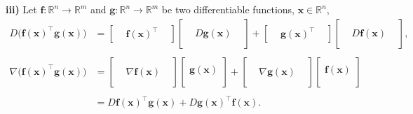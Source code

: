 \noindent
\textbf{iii)} Let \( \boldsymbol{f}: \mathbb{R}^{n} \rightarrow \mathbb{R}^{m}\) and \( \boldsymbol{g}: \mathbb{R}^{n} \rightarrow \mathbb{R}^{m}\) be two differentiable functions, \(\boldsymbol{x} \in \mathbb{R}^{n}\),
\[ 
\begin{aligned}
	D \bigg (\boldsymbol{f}(\boldsymbol{x})^{\top} \boldsymbol{g}(\boldsymbol{x}) \bigg )
	& = \left[ \begin{array}{ccc} & \boldsymbol{f}(\boldsymbol{x})^{\top} & \end{array} \right]
	\left[ \begin{array}{ccc} & & \\ & D \boldsymbol{g}(\boldsymbol{x}) & \\ & & \end{array} \right]
	+ \left[ \begin{array}{ccc} & \boldsymbol{g}(\boldsymbol{x})^{\top} & \end{array} \right]
	\left[ \begin{array}{ccc} & & \\ & 	D \boldsymbol{f}(\boldsymbol{x})  & \\ & & \end{array} \right], \\
	& \\
	\nabla \bigg (\boldsymbol{f}(\boldsymbol{x})^{\top} \boldsymbol{g}(\boldsymbol{x}) \bigg )
	& = \left[ \begin{array}{ccc} & & \\ &  \nabla \boldsymbol{f}(\boldsymbol{x}) & \\ & & \end{array} \right]
	\left[\begin{array}{c}\\  \boldsymbol{g}(\boldsymbol{x}) \\  \\ \end{array} \right ] 
	+ \left[ \begin{array}{ccc} & & \\ &  \nabla \boldsymbol{g} (\boldsymbol{x}) & \\ & & \end{array} \right]
	\left[\begin{array}{c}\\  \boldsymbol{f}(\boldsymbol{x}) \\  \\ \end{array} \right]  \\
	& \\
	& = D \boldsymbol{f}(\boldsymbol{x})^{\top} \boldsymbol{g}(\boldsymbol{x}) + 
	D \boldsymbol{g}(\boldsymbol{x})^{\top} \boldsymbol{f}(\boldsymbol{x}). \\
\end{aligned}
\]

